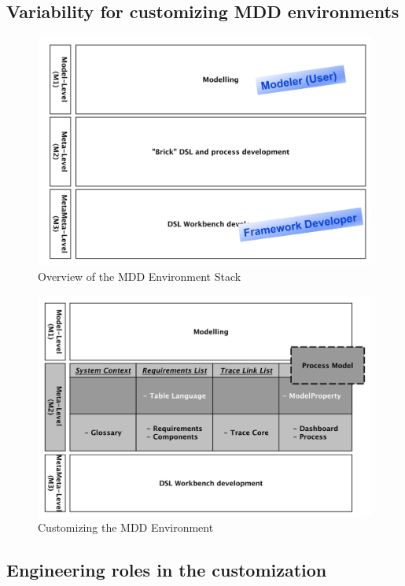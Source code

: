 \subsection{Variability for customizing MDD environments}

\begin{figure}[h]
   \begin{center}
     \includegraphics[width=1\columnwidth]{figures/frame.png}
     \caption{Overview of the MDD Environment Stack}
     \label{fig:frame}
   \end{center}
 \end{figure}
 
 
 \begin{figure}[h]
   \begin{center}
     \includegraphics[width=1\columnwidth]{figures/frame_detailed.png}
     \caption{Customizing the MDD Environment}
     \label{fig:frame}
   \end{center}
 \end{figure}
 
 \subsection{Engineering roles in the customization}